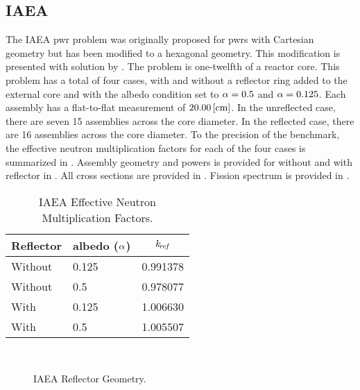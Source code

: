   \subsection{IAEA}
    \label{sec:iaea}
    The IAEA \gls{pwr} problem was originally proposed for \glspl{pwr} with
    Cartesian geometry but has been modified to a hexagonal geometry. This
    modification is presented with solution by \textcite{chao}.
    The problem is one-twelfth of a reactor core. This problem has a total of
    four cases, with and without a reflector ring added to the external core and
    with the albedo condition set to $\alpha = 0.5$ and $\alpha = 0.125$. Each
    assembly has a flat-to-flat measurement of ${20.00 \left[\text{{cm}}\right]}$. In the
    unreflected case, there are seven 15 assemblies across the core diameter. In
    the reflected case, there are 16 assemblies across the core diameter. To the
    precision of the benchmark, the effective neutron multiplication factors for
    each of the four cases is summarized in .  Assembly
    geometry and powers is provided for without and with reflector in
    . All cross sections are provided in .
    Fission spectrum is provided in .

    \begin{table}
      \caption{IAEA Effective Neutron Multiplication Factors.}
      \label{tab:iaeakref}
      \begin{center}
        \begin{tabular}{llc}
          \toprule
          Reflector & albedo ($\alpha$) & $k_{\!\mbox{\scriptsize \em ref}}$ \\
          \midrule
          Without & 0.125 & 0.991378 \\
          Without & 0.5   & 0.978077 \\
          With    & 0.125 & 1.006630 \\
          With    & 0.5   & 1.005507 \\
          \bottomrule
        \end{tabular}
      \end{center}
    \end{table}

    \begin{figure}
      \centering
      \\
      \caption{IAEA Reflector Geometry.}
      \label{fig:iaea_geom}
    \end{figure}

